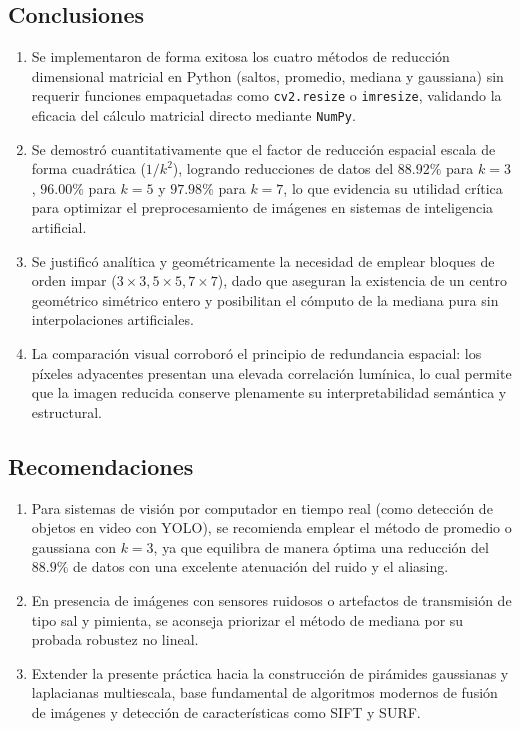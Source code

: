 \documentclass{article}
\begin{document}
\subsection{Conclusiones}
\begin{enumerate}
    \item Se implementaron de forma exitosa los cuatro métodos de reducción dimensional matricial en Python (saltos, promedio, mediana y gaussiana) sin requerir funciones empaquetadas como \texttt{cv2.resize} o \texttt{imresize}, validando la eficacia del cálculo matricial directo mediante \texttt{NumPy}.
    \item Se demostró cuantitativamente que el factor de reducción espacial escala de forma cuadrática ($1/k^2$), logrando reducciones de datos del $88.92\%$ para $k=3$, $96.00\%$ para $k=5$ y $97.98\%$ para $k=7$, lo que evidencia su utilidad crítica para optimizar el preprocesamiento de imágenes en sistemas de inteligencia artificial.
    \item Se justificó analítica y geométricamente la necesidad de emplear bloques de orden impar ($3\times3, 5\times5, 7\times7$), dado que aseguran la existencia de un centro geométrico simétrico entero y posibilitan el cómputo de la mediana pura sin interpolaciones artificiales.
    \item La comparación visual corroboró el principio de redundancia espacial: los píxeles adyacentes presentan una elevada correlación lumínica, lo cual permite que la imagen reducida conserve plenamente su interpretabilidad semántica y estructural.
\end{enumerate}

\subsection{Recomendaciones}
\begin{enumerate}
    \item Para sistemas de visión por computador en tiempo real (como detección de objetos en video con YOLO), se recomienda emplear el método de promedio o gaussiana con $k=3$, ya que equilibra de manera óptima una reducción del $88.9\%$ de datos con una excelente atenuación del ruido y el aliasing.
    \item En presencia de imágenes con sensores ruidosos o artefactos de transmisión de tipo sal y pimienta, se aconseja priorizar el método de mediana por su probada robustez no lineal.
    \item Extender la presente práctica hacia la construcción de pirámides gaussianas y laplacianas multiescala, base fundamental de algoritmos modernos de fusión de imágenes y detección de características como SIFT y SURF.
\end{enumerate}


\newpage
\printbibliography[heading=bibintoc, title={Referencias Bibliográficas}]
\end{document}
